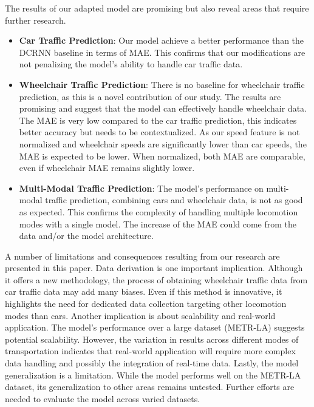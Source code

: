 The results of our adapted model are promising but also reveal areas that require further research.
\begin{itemize}
    \item \textbf{Car Traffic Prediction}:
    Our model achieve a better performance than the DCRNN baseline in terms of MAE\@.
    This confirms that our modifications are not penalizing the model's ability to handle car traffic data.
    \item \textbf{Wheelchair Traffic Prediction}:
    There is no baseline for wheelchair traffic prediction, as this is a novel contribution of our study.
    The results are promising and suggest that the model can effectively handle wheelchair data.
    The MAE is very low compared to the car traffic prediction, this indicates better accuracy but needs to be contextualized.
    As our speed feature is not normalized and wheelchair speeds are significantly lower than car speeds, the MAE is expected to be lower.
    When normalized, both MAE are comparable, even if wheelchair MAE remains slightly lower.
    \item \textbf{Multi-Modal Traffic Prediction}:
    The model's performance on multi-modal traffic prediction, combining cars and wheelchair data, is not as good as expected.
    This confirms the complexity of handling multiple locomotion modes with a single model.
    The increase of the MAE could come from the data and/or the model architecture.
\end{itemize}
\vspace{1em}

A number of limitations and consequences resulting from our research are presented in this paper.
Data derivation is one important implication.
Although it offers a new methodology, the process of obtaining wheelchair traffic data from car traffic data may add many biases.
Even if this method is innovative, it highlights the need for dedicated data collection targeting other locomotion modes than cars.
Another implication is about scalability and real-world application.
The model's performance over a large dataset (METR-LA) suggests potential scalability.
However, the variation in results across different modes of transportation indicates that real-world application will require
    more complex data handling and possibly the integration of real-time data.
Lastly, the model generalization is a limitation.
While the model performs well on the METR-LA dataset, its generalization to other areas remains untested.
Further efforts are needed to evaluate the model across varied datasets.
\vspace{1em}

